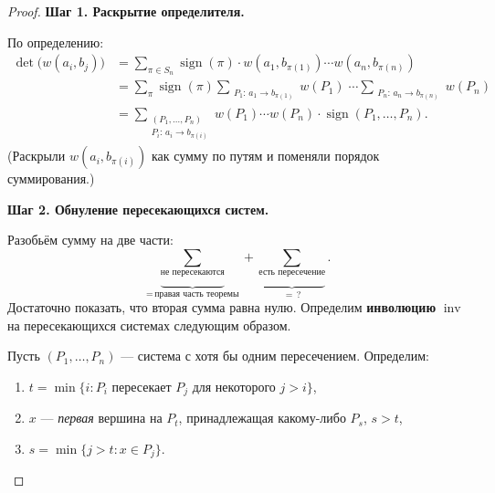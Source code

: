 \begin{proof}
	\textbf{Шаг 1. Раскрытие определителя.}

	По определению:
	\begin{align*}
		\det\!\bigl(w(a_i,b_j)\bigr)
		&= \sum_{\pi\in S_n} \operatorname{sign}(\pi)\cdot
		w(a_1, b_{\pi(1)}) \cdots w(a_n, b_{\pi(n)}) \\
		&= \sum_{\pi} \operatorname{sign}(\pi)
		\!\!\!\!\sum_{\substack{P_1:\,a_1 \to b_{\pi(1)}}}\!\!\! w(P_1)
		\;\cdots\!\!\!\!
		\sum_{\substack{P_n:\,a_n \to b_{\pi(n)}}}\!\!\! w(P_n) \\
		&= \sum_{\substack{(P_1,\ldots,P_n) \\ P_i:\,a_i \to b_{\pi(i)}}}
		w(P_1)\cdots w(P_n)\cdot\operatorname{sign}(P_1,\ldots,P_n).
	\end{align*}
	(Раскрыли $w(a_i,b_{\pi(i)})$ как сумму по путям и поменяли порядок суммирования.)

	\textbf{Шаг 2. Обнуление пересекающихся систем.}

	Разобьём сумму на две части:
	\[
	\underbrace{\sum_{\text{не пересекаются}}}_{=\,\text{правая часть теоремы}}
	+
	\underbrace{\sum_{\text{есть пересечение}}}_{=\,?}.
	\]
	Достаточно показать, что вторая сумма равна нулю. Определим \textbf{инволюцию}
	$\operatorname{inv}$ на пересекающихся системах следующим образом.

	Пусть $(P_1,\ldots,P_n)$ — система с хотя бы одним пересечением. Определим:
	\begin{enumerate}
		\item $t = \min\{i : P_i \text{ пересекает } P_j \text{ для некоторого } j>i\}$,
		\item $x$ — \emph{первая} вершина на $P_t$, принадлежащая какому-либо $P_s$, $s > t$,
		\item $s = \min\{j > t : x \in P_j\}$.
	\end{enumerate}

	\begin{center}
	\end{center}


\end{proof}
